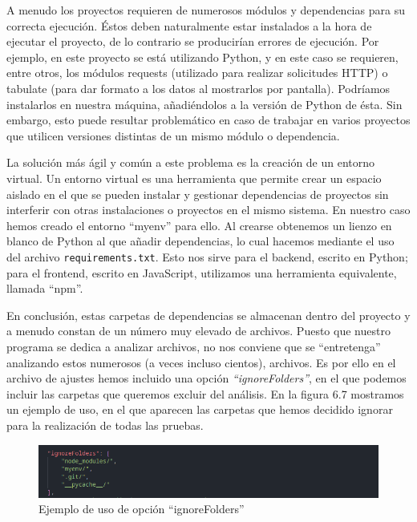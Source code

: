 \documentclass[a4paper, 12pt]{book}
\begin{document}
A menudo los proyectos requieren de numerosos módulos y dependencias para su correcta ejecución. Éstos deben naturalmente estar instalados a la hora de ejecutar el proyecto, de lo contrario se producirían errores de ejecución. Por ejemplo, en este proyecto se está utilizando Python, y en este caso se requieren, entre otros, los módulos requests (utilizado para realizar solicitudes HTTP) o tabulate (para dar formato a los datos al mostrarlos por pantalla). Podríamos instalarlos en nuestra máquina, añadiéndolos a la versión de Python de ésta. Sin embargo, esto puede resultar problemático en caso de trabajar en varios proyectos que utilicen versiones distintas de un mismo módulo o dependencia.

La solución más ágil y común a este problema es la creación de un entorno virtual. Un entorno virtual es una herramienta que permite crear un espacio aislado en el que se pueden instalar y gestionar dependencias de proyectos sin interferir con otras instalaciones o proyectos en el mismo sistema. En nuestro caso hemos creado el entorno ``myenv'' para ello. Al crearse obtenemos un lienzo en blanco de Python al que añadir dependencias, lo cual hacemos mediante el uso del archivo \texttt{requirements.txt}. Esto nos sirve para el backend, escrito en Python; para el frontend, escrito en JavaScript, utilizamos una herramienta equivalente, llamada ``npm''.

En conclusión, estas carpetas de dependencias se almacenan dentro del proyecto y a menudo constan de un número muy elevado de archivos. Puesto que nuestro programa se dedica a analizar archivos, no nos conviene que se ``entretenga'' analizando estos numerosos (a veces incluso cientos), archivos. Es por ello en el archivo de ajustes hemos incluido una opción \textit{``ignoreFolders''}, en el que podemos incluir las carpetas que queremos excluir del análisis. En la figura 6.7 mostramos un ejemplo de uso, en el que aparecen las carpetas que hemos decidido ignorar para la realización de todas las pruebas.

\begin{figure}[H]
    \centering
    \includegraphics[width=\textwidth, keepaspectratio]{img/results/ignore_folders.png}
    \caption{Ejemplo de uso de opción ``ignoreFolders''}
    \label{fig:ignore_folders}
\end{figure}
\end{document}
